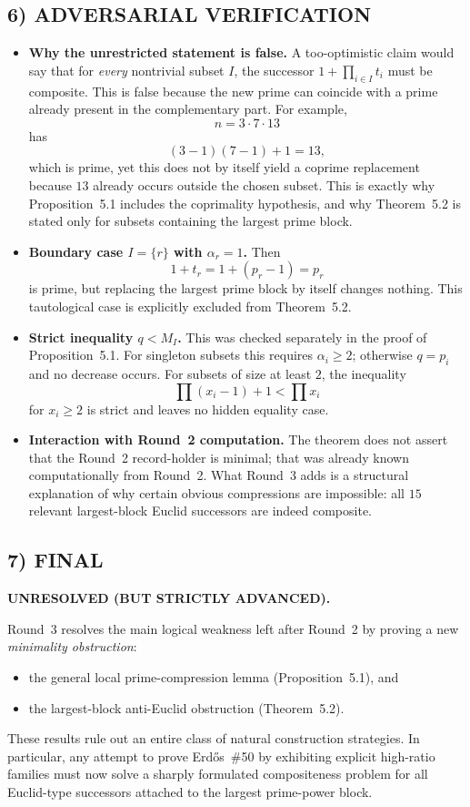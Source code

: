 \subsection*{6) ADVERSARIAL VERIFICATION}
\begin{itemize}
\item \textbf{Why the unrestricted statement is false.}
A too-optimistic claim would say that for \emph{every} nontrivial subset $I$, the successor $1+\prod_{i\in I}t_i$ must be composite. This is false because the new prime can coincide with a prime already present in the complementary part.
For example,
\[
 n=3\cdot 7\cdot 13
\]
has
\[
 (3-1)(7-1)+1=13,
\]
which is prime, yet this does not by itself yield a coprime replacement because $13$ already occurs outside the chosen subset. This is exactly why Proposition~5.1 includes the coprimality hypothesis, and why Theorem~5.2 is stated only for subsets containing the largest prime block.

\item \textbf{Boundary case $I=\{r\}$ with $\alpha_r=1$.}
Then
\[
 1+t_r=1+(p_r-1)=p_r
\]
is prime, but replacing the largest prime block by itself changes nothing. This tautological case is explicitly excluded from Theorem~5.2.

\item \textbf{Strict inequality $q<M_I$.}
This was checked separately in the proof of Proposition~5.1.
For singleton subsets this requires $\alpha_i\ge 2$; otherwise $q=p_i$ and no decrease occurs.
For subsets of size at least $2$, the inequality
\[
 \prod (x_i-1)+1<\prod x_i
\]
for $x_i\ge 2$ is strict and leaves no hidden equality case.

\item \textbf{Interaction with Round~2 computation.}
The theorem does not assert that the Round~2 record-holder is minimal; that was already known computationally from Round~2. What Round~3 adds is a structural explanation of why certain obvious compressions are impossible: all $15$ relevant largest-block Euclid successors are indeed composite.
\end{itemize}

\subsection*{7) FINAL}
\textbf{UNRESOLVED (BUT STRICTLY ADVANCED).}

Round~3 resolves the main logical weakness left after Round~2 by proving a new \emph{minimality obstruction}:
\begin{itemize}
\item the general local prime-compression lemma (Proposition~5.1), and
\item the largest-block anti-Euclid obstruction (Theorem~5.2).
\end{itemize}
These results rule out an entire class of natural construction strategies. In particular, any attempt to prove Erd\H{o}s~\#50 by exhibiting explicit high-ratio families must now solve a sharply formulated compositeness problem for all Euclid-type successors attached to the largest prime-power block.

